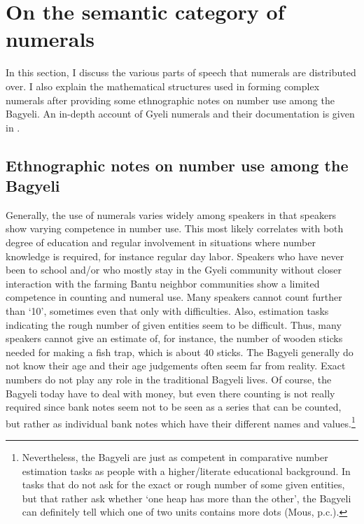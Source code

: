 \section{On the semantic category of numerals} 
\label{sec:Enum}

In this section, I discuss the various parts of speech that numerals are distributed over. I also explain the mathematical structures used in forming complex numerals after providing some ethnographic notes on number use among the Bagyeli. An in-depth account of Gyeli numerals and their documentation is given in \citet{grimm2020b}. 

\subsection{Ethnographic notes on number use among the Bagyeli} Generally, the use of numerals varies widely among speakers in that speakers show varying competence in number use. This most likely correlates with both  degree of education and regular involvement in situations where number knowledge is required, for instance regular day labor. Speakers who have never been to school and/or who mostly stay in the Gyeli community without closer interaction with the farming Bantu neighbor communities show a limited competence in counting and numeral use. Many speakers cannot count further than `10', sometimes even that only with difficulties. Also, estimation tasks indicating the rough number of given entities seem to be  difficult. Thus, many speakers cannot give an estimate of, for instance, the number of wooden sticks needed for making a fish trap, which is about 40 sticks. The Bagyeli generally do not know their age and their age judgements often seem far from reality. Exact numbers do not play any role in the traditional Bagyeli lives. Of course, the Bagyeli today have to deal with money, but even there counting is not really required since bank notes seem not to be seen as a series that can be counted, but rather as individual bank notes which have their different names and values.\footnote{Nevertheless, the Bagyeli are just as competent in comparative number estimation tasks as people with a higher/literate educational background. In tasks that do not ask for the exact or rough number of some given entities, but that rather ask whether `one heap has more than the other', 
the Bagyeli can definitely tell which one of two units contains more dots (Mous, p.c.).}

